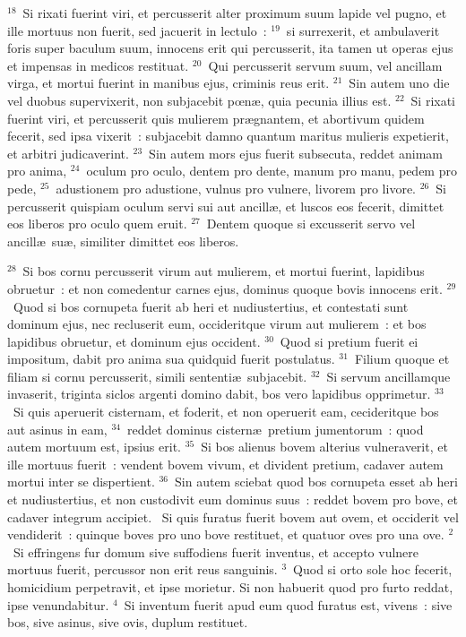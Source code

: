 ${}^{18}$~Si rixati fuerint viri, et percusserit alter proximum suum lapide vel pugno, et ille mortuus non fuerit, sed jacuerit in lectulo~:
${}^{19}$~si surrexerit, et ambulaverit foris super baculum suum, innocens erit qui percusserit, ita tamen ut operas ejus et impensas in medicos restituat.
${}^{20}$~Qui percusserit servum suum, vel ancillam virga, et mortui fuerint in manibus ejus, criminis reus erit.
${}^{21}$~Sin autem uno die vel duobus supervixerit, non subjacebit pœn\ae , quia pecunia illius est.
${}^{22}$~Si rixati fuerint viri, et percusserit quis mulierem pr\ae gnantem, et abortivum quidem fecerit, sed ipsa vixerit~: subjacebit damno quantum maritus mulieris expetierit, et arbitri judicaverint.
${}^{23}$~Sin autem mors ejus fuerit subsecuta, reddet animam pro anima,
${}^{24}$~oculum pro oculo, dentem pro dente, manum pro manu, pedem pro pede,
${}^{25}$~adustionem pro adustione, vulnus pro vulnere, livorem pro livore.
${}^{26}$~Si percusserit quispiam oculum servi sui aut ancill\ae , et luscos eos fecerit, dimittet eos liberos pro oculo quem eruit.
${}^{27}$~Dentem quoque si excusserit servo vel ancill\ae\ su\ae , similiter dimittet eos liberos.


${}^{28}$~Si bos cornu percusserit virum aut mulierem, et mortui fuerint, lapidibus obruetur~: et non comedentur carnes ejus, dominus quoque bovis innocens erit.
${}^{29}$~Quod si bos cornupeta fuerit ab heri et nudiustertius, et contestati sunt dominum ejus, nec recluserit eum, occideritque virum aut mulierem~: et bos lapidibus obruetur, et dominum ejus occident.
${}^{30}$~Quod si pretium fuerit ei impositum, dabit pro anima sua quidquid fuerit postulatus.
${}^{31}$~Filium quoque et filiam si cornu percusserit, simili sententi\ae\ subjacebit.
${}^{32}$~Si servum ancillamque invaserit, triginta siclos argenti domino dabit, bos vero lapidibus opprimetur.
${}^{33}$~Si quis aperuerit cisternam, et foderit, et non operuerit eam, cecideritque bos aut asinus in eam,
${}^{34}$~reddet dominus cistern\ae\ pretium jumentorum~: quod autem mortuum est, ipsius erit.
${}^{35}$~Si bos alienus bovem alterius vulneraverit, et ille mortuus fuerit~: vendent bovem vivum, et divident pretium, cadaver autem mortui inter se dispertient.
${}^{36}$~Sin autem sciebat quod bos cornupeta esset ab heri et nudiustertius, et non custodivit eum dominus suus~: reddet bovem pro bove, et cadaver integrum accipiet.
~\lettrine[lines=10,image=true,loversize=0.05,lraise=-0.03]{S}{}i quis furatus fuerit bovem aut ovem, et occiderit vel vendiderit~: quinque boves pro uno bove restituet, et quatuor oves pro una ove.
${}^{2}$~Si effringens fur domum sive suffodiens fuerit inventus, et accepto vulnere mortuus fuerit, percussor non erit reus sanguinis.
${}^{3}$~Quod si orto sole hoc fecerit, homicidium perpetravit, et ipse morietur. Si non habuerit quod pro furto reddat, ipse venundabitur.
${}^{4}$~Si inventum fuerit apud eum quod furatus est, vivens~: sive bos, sive asinus, sive ovis, duplum restituet.


